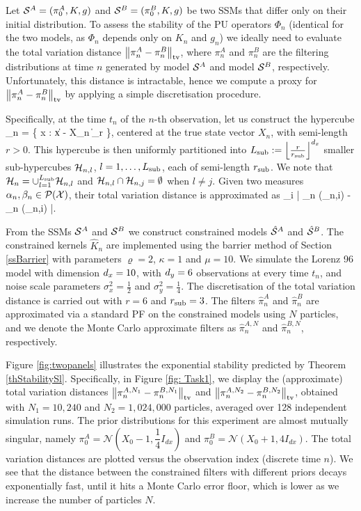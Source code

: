 \documentclass[onefignum,onetabnum]{siamonline250211}%
\begin{document}
Let ${\mathcal S}^A=(\pi_0^A,K,g)$ and ${\mathcal S}^B=(\pi_0^B,K,g)$ be two SSMs that differ only on their initial distribution. To assess the stability of the PU operators $\Phi_n$ (identical for the two models, as $\Phi_n$ depends only on $K_n$ and $g_n$) we ideally need to evaluate the total variation distance $\left\| \pi_n^A-\pi_n^B \right\|_{\rm tv}$, where $\pi_n^A$ and $\pi_n^B$ are the filtering distributions at time $n$ generated by model ${\mathcal S}^A$ and model ${\mathcal S}^B$, respectively. Unfortunately, this distance is intractable, hence we compute a proxy for $\left\| \pi_n^A-\pi_n^B \right\|_{\rm tv}$ by applying a simple discretisation procedure.

Specifically, at the time $t_n$ of the $n$-th observation, let us construct the hypercube 
\beq
\mH_n = \{ x \in \mX : \| x - X_n \|_\infty \le r \},
\nn
\eeq
centered at the true state vector $X_n$, with semi-length $r > 0$. This hypercube is then uniformly partitioned into $L_{\rm sub} := {\left\lfloor \frac{r}{r_{\text{sub}} } \right\rfloor^{d_x}}$ smaller sub-hypercubes ${\mathcal H}_{n,l}$, $l=1,\ldots,L_{\rm sub}$, each of semi-length $r_{\rm sub}$. We note that ${\mathcal H}_n = \cup_{l=1}^{L_{\rm sub}} {\mathcal H}_{n,l}$ and ${\mathcal H}_{n,l} \cap {\mathcal H}_{n,j} = \emptyset$ when $l \ne j$. Given two measures $\alpha_n, \beta_n \in {\mathcal P}({\mathcal X})$, their total variation distance is approximated as
\beq \label{eq: dtv_formula}
\approx
{} \sum_{i} \big| \alpha_n (_{n,i}) - \beta_n (_{n,i}) \big|.
\eeq

From the SSMs ${\mathcal S}^A$ and ${\mathcal S}^B$ we construct constrained models $\hat {{\mathcal S}}^A$ and $\hat {{\mathcal S}}^B$. The constrained kernels $\hat K_n$ are implemented using the barrier method of Section \ref{ssBarrier} with parameters $\varrho=2$, $\kappa = 1$ and $\mu=10$. We simulate the Lorenz 96 model with dimension $d_x=10$, with $d_y=6$ observations at every time $t_n$, and noise scale parameters $\sigma_x^2 = \frac{1}{2}$ and $\sigma_y^2=\frac{1}{4}$. The discretisation of the total variation distance is carried out with $r=6$ and $r_{\rm sub}=3$. The filters $\hat\pi_n^A$ and $\hat\pi_n^B$ are approximated via a standard PF on the constrained models using $N$ particles, and we denote the Monte Carlo approximate filters as $\hat\pi_n^{A,N}$ and $\hat\pi_n^{B,N}$, respectively.

Figure \ref{fig:twopanels} illustrates the exponential stability predicted by Theorem \ref{thStabilitySl}. Specifically, in Figure \ref{fig: Task1}, we display the (approximate) total variation distances $\left\| \pi_n^{A,N_1} - \pi_n^{B,N_1} \right\|_{\rm tv}$ and $\left\| \pi_n^{A,N_2} - \pi_n^{B,N_2} \right\|_{\rm tv}$, obtained with $N_1=10,240$ and $N_2=1,024,000$ particles, averaged over 128 independent simulation runs. The prior distributions for this experiment are almost mutually singular, namely $\pi_0^A = \mathcal{N}(X_0-1,\dfrac{1}{4}I_{dx})$ and $\pi_0^B = \mathcal{N}(X_0+1,4I_{dx})$. The total variation distances are plotted versus the observation index (discrete time $n$). We see that the distance between the constrained filters with different priors decays exponentially fast, until it hits a Monte Carlo error floor, which is lower as we increase the number of particles $N$.
\end{document}
